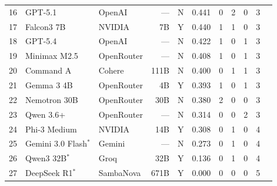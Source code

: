 \documentclass[conference]{IEEEtran}
\begin{document}
\begin{table}[t]
\begin{tabular}{rllrccccccc}
16 & GPT-5.1 & OpenAI & --- & N & 0.441 & 0 & 2 & 0 & 3 \\
17 & Falcon3 7B & NVIDIA & 7B & Y & 0.440 & 1 & 1 & 0 & 3 \\
18 & GPT-5.4 & OpenAI & --- & N & 0.422 & 1 & 0 & 1 & 3 \\
19 & Minimax M2.5 & OpenRouter & --- & N & 0.408 & 1 & 0 & 1 & 3 \\
20 & Command A & Cohere & 111B & N & 0.400 & 0 & 1 & 1 & 3 \\
21 & Gemma 3 4B & OpenRouter & 4B & Y & 0.393 & 1 & 0 & 1 & 3 \\
22 & Nemotron 30B & OpenRouter & 30B & N & 0.380 & 2 & 0 & 0 & 3 \\
23 & Qwen 3.6+ & OpenRouter & --- & N & 0.314 & 0 & 0 & 2 & 3 \\
24 & Phi-3 Medium & NVIDIA & 14B & Y & 0.308 & 0 & 1 & 0 & 4 \\
25 & Gemini 3.0 Flash$^*$ & Gemini & --- & N & 0.273 & 0 & 1 & 0 & 4 \\
26 & Qwen3 32B$^*$ & Groq & 32B & Y & 0.136 & 0 & 1 & 0 & 4 \\
27 & DeepSeek R1$^*$ & SambaNova & 671B & Y & 0.000 & 0 & 0 & 0 & 5 \\
\bottomrule
\end{tabular}
\end{table}
\end{document}
